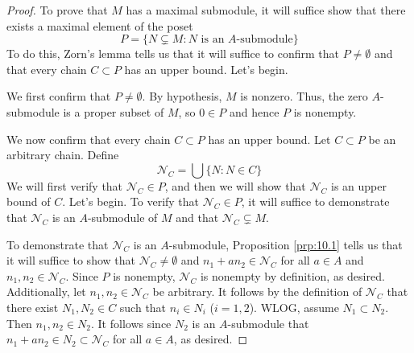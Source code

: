 \documentclass[../notes.tex]{subfiles}
\begin{document}
\begin{itemize}
\begin{proof}

        To prove that $M$ has a maximal submodule, it will suffice show that there exists a maximal element of the poset
        \begin{equation*}
            P = \{N\subsetneq M:N\text{ is an }A\text{-submodule}\}
        \end{equation*}
        To do this, Zorn's lemma tells us that it will suffice to confirm that $P\neq\emptyset$ and that every chain $C\subset P$ has an upper bound. Let's begin.\par
        We first confirm that $P\neq\emptyset$. By hypothesis, $M$ is nonzero. Thus, the zero $A$-submodule is a proper subset of $M$, so $0\in P$ and hence $P$ is nonempty.\par
        We now confirm that every chain $C\subset P$ has an upper bound. Let $C\subset P$ be an arbitrary chain. Define
        \begin{equation*}
            \mathcal{N}_C = \bigcup\{N:N\in C\}
        \end{equation*}
        We will first verify that $\mathcal{N}_C\in P$, and then we will show that $\mathcal{N}_C$ is an upper bound of $C$. Let's begin. To verify that $\mathcal{N}_C\in P$, it will suffice to demonstrate that $\mathcal{N}_C$ is an $A$-submodule of $M$ and that $\mathcal{N}_C\subsetneq M$.\par
        To demonstrate that $\mathcal{N}_C$ is an $A$-submodule, Proposition \ref{prp:10.1} tells us that it will suffice to show that $\mathcal{N}_C\neq\emptyset$ and $n_1+an_2\in\mathcal{N}_C$ for all $a\in A$ and $n_1,n_2\in\mathcal{N}_C$. Since $P$ is nonempty, $\mathcal{N}_C$ is nonempty by definition, as desired. Additionally, let $n_1,n_2\in\mathcal{N}_C$ be arbitrary. It follows by the definition of $\mathcal{N}_C$ that there exist $N_1,N_2\in C$ such that $n_i\in N_i$ ($i=1,2$). WLOG, assume $N_1\subset N_2$. Then $n_1,n_2\in N_2$. It follows since $N_2$ is an $A$-submodule that $n_1+an_2\in N_2\subset\mathcal{N}_C$ for all $a\in A$, as desired.\par

\end{proof}
\end{itemize}
\end{document}
